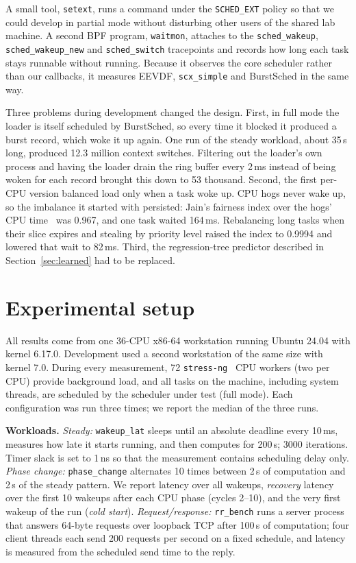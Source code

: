 \documentclass[conference]{IEEEtran}
\newcommand{\us}{\,\textmu{}s}
\newcommand{\ms}{\,ms}
\newcommand{\code}[1]{\texttt{\small #1}}
\begin{document}
A small tool, \code{setext}, runs a command under the \code{SCHED\_EXT} policy so that we could
develop in partial mode without disturbing other users of the shared lab machine. A second BPF
program, \code{waitmon}, attaches to the \code{sched\_wakeup}, \code{sched\_wakeup\_new} and
\code{sched\_switch} tracepoints and records how long each task stays runnable without running.
Because it observes the core scheduler rather than our callbacks, it measures EEVDF,
\code{scx\_simple} and BurstSched in the same way.

Three problems during development changed the design. First, in full mode the loader is itself
scheduled by BurstSched, so every time it blocked it produced a burst record, which woke it up
again. One run of the steady workload, about 35\,s long, produced 12.3 million context switches. Filtering out the loader's own
process and having the loader drain the ring buffer every 2\ms{} instead of being woken for
each record brought this down to 53 thousand. Second, the first per-CPU version balanced load
only when a task woke up. CPU hogs never wake up, so the imbalance it started with persisted:
Jain's fairness index over the hogs' CPU time~\cite{jain} was 0.967, and one task waited
164\ms.
Rebalancing long tasks when their slice expires and stealing by priority level raised the index
to 0.9994 and lowered that wait to 82\ms. Third, the regression-tree predictor described in
Section~\ref{sec:learned} had to be replaced.

\section{Experimental setup}\label{sec:method}

All results come from one 36-CPU x86-64 workstation running Ubuntu 24.04 with kernel
6.17.0. Development used a second workstation of the same size with kernel 7.0. During every
measurement, 72 \code{stress-ng}~\cite{stressng} CPU workers (two per CPU) provide background
load, and all tasks on the machine, including system threads, are scheduled by the scheduler
under test (full mode). Each configuration was run three times; we report the median of the three
runs.

\textbf{Workloads.} \emph{Steady:} \code{wakeup\_lat} sleeps until an absolute deadline every
10\ms, measures how late it starts running, and then computes for 200\us; 3000 iterations. Timer
slack is set to 1\,ns so that the measurement contains scheduling delay only.
\emph{Phase change:} \code{phase\_change} alternates 10 times between 2\,s of computation and
2\,s of the steady pattern. We report latency over all wakeups, \emph{recovery} latency over the
first 10 wakeups after each CPU phase (cycles 2--10), and the very first wakeup of the run
(\emph{cold start}). \emph{Request/response:} \code{rr\_bench} runs a server process that answers
64-byte requests over loopback TCP after 100\us{} of computation; four client threads each send
200 requests per second on a fixed schedule, and latency is measured from the scheduled send time
to the reply.
\end{document}
